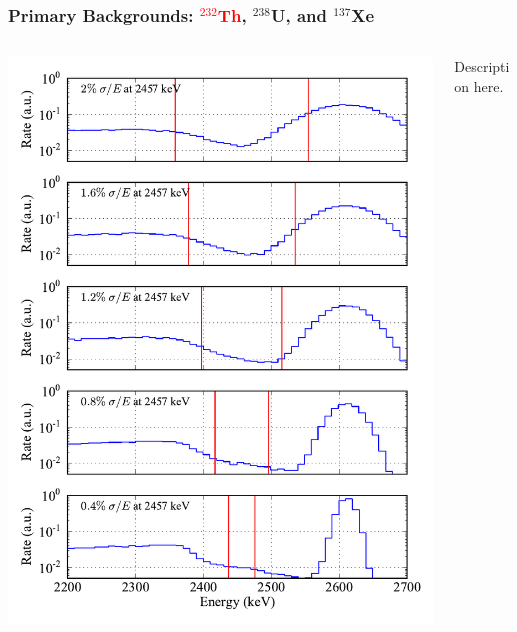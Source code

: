 \documentclass{beamer}
\begin{document}
\begin{frame}
\begin{center}
\frametitle{Primary Backgrounds: \textcolor{red}{$^{232}$Th}, $^{238}$U, and $^{137}$Xe}
\end{center}
\begin{columns}
\begin{column}{.6\textwidth}
\includegraphics[keepaspectratio=true,width=\textwidth]{Th_Spectra_vs_Res.pdf}
\end{column}
\begin{column}{.4\textwidth}
Description here.
\end{column}
\end{columns}
\end{frame}
\end{document}
